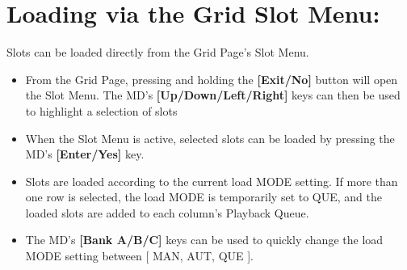 \section{Loading via the Grid Slot Menu:}
Slots can be loaded directly from the Grid Page's Slot Menu.
\begin{itemize}
\item From the Grid Page, pressing and holding the \textbf{[Exit/No]} button will open the Slot Menu. The MD's \textbf{[Up/Down/Left/Right]} keys can then be used to highlight a selection of slots
\item When the Slot Menu is active, selected slots can be loaded by pressing the MD's \textbf{[Enter/Yes]} key.
\item Slots are loaded according to the current load MODE setting. If more than one row is selected, the load MODE is temporarily set to QUE, and the loaded slots are added to each column's Playback Queue.
\item The MD's \textbf{[Bank A/B/C]} keys can be used to quickly change the load MODE setting between [ MAN, AUT, QUE ].
\end{itemize}
